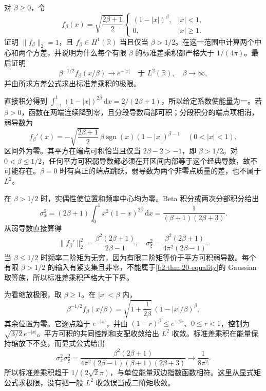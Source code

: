 \begin{optionalexercise}\label{b2:ex:20-new-3}
对 \(\beta\geq0\)，令
\[
 f_\beta(x)=\sqrt{\frac{2\beta+1}{2}}
 \begin{cases}
 (1-|x|)^\beta,& |x|<1,\\
 0,& |x|\geq1.
 \end{cases}
\]
证明 \(\|f_\beta\|_2=1\)，且 \(f_\beta\in H^1(\mathbb R)\) 当且仅当 \(\beta>1/2\)。在这一范围中计算两个中心和两个方差，并说明为什么每个有限 \(\beta\) 的标准差乘积都严格大于 \(1/(4\pi)\)。最后证明
\[
 \beta^{-1/2}f_\beta(x/\beta)\longrightarrow e^{-|x|}
 \quad\text{于 }L^2(\mathbb R),\quad\beta\longrightarrow\infty,
\]
并由所求方差公式求出标准差乘积的极限。
\end{optionalexercise}
\begin{solution}
直接积分得到 \(\int_{-1}^1(1-|x|)^{2\beta}\,\mathrm dx=2/(2\beta+1)\)，所以给定系数使能量为一。若 \(\beta>0\)，函数在两端连续降到零，且分段导数局部可积；分段积分的端点项相消，弱导数为
\[
 f_\beta'(x)=-\sqrt{\frac{2\beta+1}{2}}\,
  \beta\operatorname{sgn}(x)(1-|x|)^{\beta-1}
 \quad(0<|x|<1),
\]
区间外为零。其平方在端点可积恰当且仅当
\(2\beta-2>-1\)，即 \(\beta>1/2\)。对 \(0<\beta\leq1/2\)，任何平方可积弱导数都必须在开区间内部等于这个经典导数，故不可能存在。\(\beta=0\) 时有真正的端点跳跃，弱导数为两个非零点质量的差，也不属于 \(L^2\)。

在 \(\beta>1/2\) 时，实偶性使位置和频率中心均为零。Beta 积分或两次分部积分给出
\[
 \sigma_x^2
 =(2\beta+1)\int_0^1x^2(1-x)^{2\beta}\,\mathrm dx
 =\frac1{(\beta+1)(2\beta+3)}.
\]
从弱导数直接算得
\[
 \|f_\beta'\|_2^2
 =\frac{\beta^2(2\beta+1)}{2\beta-1},
 \quad
 \sigma_\xi^2
 =\frac{\beta^2(2\beta+1)}{4\pi^2(2\beta-1)}.
\]
当 \(\beta\leq1/2\) 时频率二阶矩为无穷，因为有限二阶矩等价于平方可积弱导数。每个有限 \(\beta>1/2\) 的输入有紧支集且非零，不能属于\cref{b2:thm:20-equality}的 Gaussian 取等族，所以标准差乘积严格大于下界。

为看缩放极限，取 \(\beta\geq1\)。在 \(|x|<\beta\) 内，
\[
 \beta^{-1/2}f_\beta(x/\beta)
 =\sqrt{1+\frac1{2\beta}}\,
              (1-|x|/\beta)^\beta,
\]
其余位置为零。它逐点趋于 \(e^{-|x|}\)，并由
\((1-r)^\beta\leq e^{-\beta r}\)、\(0\leq r<1\)，控制为 \(\sqrt{3/2}\,e^{-|x|}\)。平方可积的共同控制和支配收敛给出 \(L^2\) 收敛。标准差乘积在能量保持缩放下不变，而显式公式给出
\[
 \sigma_x^2\sigma_\xi^2
 =\frac{\beta^2(2\beta+1)}
 {4\pi^2(2\beta-1)(\beta+1)(2\beta+3)}
 \longrightarrow\frac1{8\pi^2}.
\]
所以标准差乘积趋于 \(1/(2\sqrt2\pi)\)，与单位能量双边指数函数相符。这里从显式矩公式求极限，没有把一般 \(L^2\) 收敛误当成二阶矩收敛。
\end{solution}

